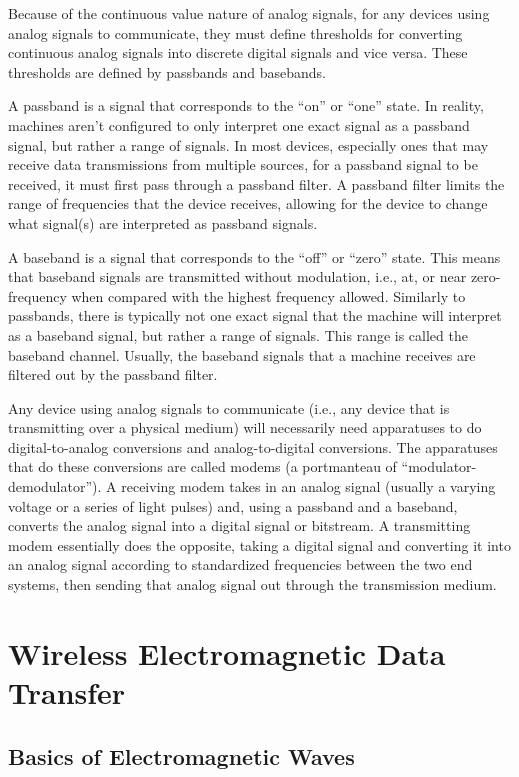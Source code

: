 \documentclass[11pt]{article}
\begin{document}
Because of the continuous value nature of analog signals, for any devices using analog signals to communicate, they must define thresholds for converting continuous analog signals into discrete digital signals and vice versa. These thresholds are defined by passbands and basebands.

A passband is a signal that corresponds to the “on” or “one” state. In reality, machines aren’t configured to only interpret one exact signal as a passband signal, but rather a range of signals. In most devices, especially ones that may receive data transmissions from multiple sources, for a passband signal to be received, it must first pass through a passband filter. A passband filter limits the range of frequencies that the device receives, allowing for the device to change what signal(s) are interpreted as passband signals.

A baseband is a signal that corresponds to the “off” or “zero” state. This means that baseband signals are transmitted without modulation, i.e., at, or near zero-frequency when compared with the highest frequency allowed. Similarly to passbands, there is typically not one exact signal that the machine will interpret as a baseband signal, but rather a range of signals. This range is called the baseband channel. Usually, the baseband signals that a machine receives are filtered out by the passband filter.

Any device using analog signals to communicate (i.e., any device that is transmitting over a physical medium) will necessarily need apparatuses to do digital-to-analog conversions and analog-to-digital conversions. The apparatuses that do these conversions are called modems (a portmanteau of “modulator-demodulator”). A receiving modem takes in an analog signal (usually a varying voltage or a series of light pulses) and, using a passband and a baseband, converts the analog signal into a digital signal or bitstream. A transmitting modem essentially does the opposite, taking a digital signal and converting it into an analog signal according to standardized frequencies between the two end systems, then sending that analog signal out through the transmission medium. 

\section{Wireless Electromagnetic Data Transfer}

\subsection{Basics of Electromagnetic Waves}
\end{document}
